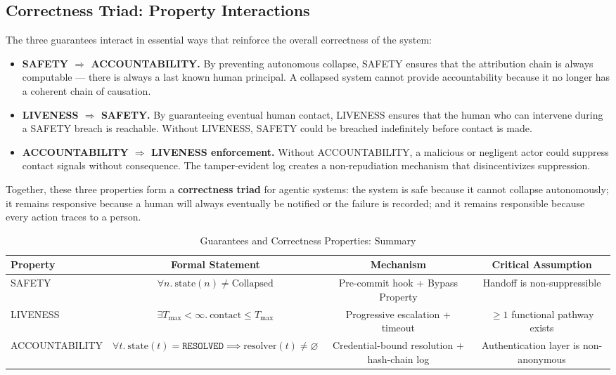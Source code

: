 \subsection{Correctness Triad: Property Interactions}
\label{sec:correctness-triad}

The three guarantees interact in essential ways that reinforce the overall
correctness of the system:

\begin{itemize}
\item \textbf{SAFETY $\Rightarrow$ ACCOUNTABILITY.}  By preventing autonomous
  collapse, SAFETY ensures that the attribution chain is always computable ---
  there is always a last known human principal.  A collapsed system cannot
  provide accountability because it no longer has a coherent chain of causation.

\item \textbf{LIVENESS $\Rightarrow$ SAFETY.}  By guaranteeing eventual human
  contact, LIVENESS ensures that the human who can intervene during a SAFETY
  breach is reachable.  Without LIVENESS, SAFETY could be breached indefinitely
  before contact is made.

\item \textbf{ACCOUNTABILITY $\Rightarrow$ LIVENESS enforcement.}  Without
  ACCOUNTABILITY, a malicious or negligent actor could suppress contact signals
  without consequence.  The tamper-evident log creates a non-repudiation
  mechanism that disincentivizes suppression.
\end{itemize}

Together, these three properties form a \textbf{correctness triad} for agentic
systems: the system is safe because it cannot collapse autonomously; it remains
responsive because a human will always eventually be notified or the failure is
recorded; and it remains responsible because every action traces to a person.

\begin{table}[h]
\caption{Guarantees and Correctness Properties: Summary}
\label{tab:guarantees-summary}
\centering
\begin{tabular}{@{}lccc@{}}
\toprule
\textbf{Property} & \textbf{Formal Statement} & \textbf{Mechanism} & \textbf{Critical Assumption} \\
\midrule
SAFETY & $\forall n.\ \text{state}(n) \neq \text{Collapsed}$ &
  Pre-commit hook + Bypass Property & Handoff is non-suppressible \\
LIVENESS & $\exists T_{\max} < \infty.\ \text{contact} \leq T_{\max}$ &
  Progressive escalation + timeout & $\geq 1$ functional pathway exists \\
ACCOUNTABILITY & $\forall t.\ \text{state}(t) = \texttt{RESOLVED} \implies
  \text{resolver}(t) \neq \varnothing$ &
  Credential-bound resolution + hash-chain log & Authentication layer is non-anonymous \\
\bottomrule
\end{tabular}
\end{table}

